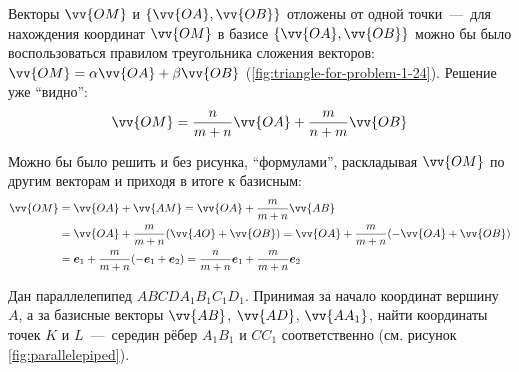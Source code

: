 \documentclass[a4paper,12pt]{article}
\begin{document}
\begin{solution}
    Векторы $\vv{OM}$ и $\{\vv{OA}, \vv{OB}\}$ отложены от одной точки~---~для нахождения координат $\vv{OM}$ в базисе $\{\vv{OA}, \vv{OB}\}$ можно бы было воспользоваться правилом треугольника сложения векторов: $\vv{OM} \hm= \alpha \vv{OA} \hm+ \beta \vv{OB}$ (\ref{fig:triangle-for-problem-1-24}).
    Решение уже ``видно'':
    \[
      \vv{OM} = \frac{n}{m + n} \vv{OA} + \frac{m}{n + m} \vv{OB}
    \]
    
    Можно бы было решить и без рисунка, ``формулами'', раскладывая $\vv{OM}$ по другим векторам и приходя в итоге к базисным:
    \begin{equation*}
    \begin{split}
      \vv{OM} &= \vv{OA} + \vv{AM}
      = \vv{OA} + \frac{m}{m + n} \vv{AB}\\
      &= \vv{OA} + \frac{m}{m + n} (\vv{AO} + \vv{OB})
      = \vv{OA} + \frac{m}{m + n} (-\vv{OA} + \vv{OB})\\
      &= \bds e_1 + \frac{m}{m + n} (-\bds e_1 + \bds e_2)
      = \frac{n}{m + n} \bds e_1 + \frac{m}{m + n} \bds e_2
    \end{split}
    \end{equation*}
  \end{solution}
  
  
  \begin{problem}[1.28(2)]
    Дан параллелепипед $ABCDA_1B_1C_1D_1$.
    Принимая за начало координат вершину $A$, а за базисные векторы $\vv{AB}$, $\vv{AD}$, $\vv{AA_1}$,
    найти координаты точек $K$ и $L$~---~середин рёбер $A_1B_1$ и $CC_1$ соответственно (см. рисунок \ref{fig:parallelepiped}).
  \end{problem}
\end{document}
